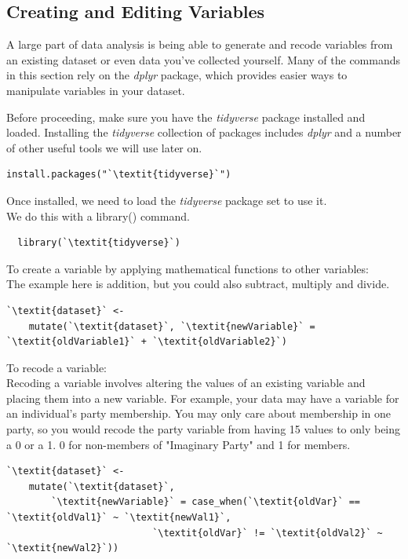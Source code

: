 \documentclass[12pt,letterpaper]{article}
\newcommand{\ind}{\phantom{AA}}
\begin{document}
\subsection{Creating and Editing Variables}
\normalsize 
A large part of data analysis is being able to generate and recode variables from an existing dataset or even data you've collected yourself. Many of the commands in this section rely on the \textit{dplyr} package, which provides easier ways to manipulate variables in your dataset. 

\vspace{1em}

\begin{tcolorbox}[title = Recoding Variables]
Before proceeding, make sure you have the \textit{tidyverse} package installed and loaded. Installing the \textit{tidyverse} collection of packages includes \textit{dplyr} and a number of other useful tools we will use later on. 
\begin{lstlisting}[frameround = t t t t, backgroundcolor = \color{lightgray}]
  install.packages("`\textit{tidyverse}`")
\end{lstlisting}
Once installed, we need to load the \textit{tidyverse} package set to use it. \\ \ind We do this with a library() command.
\begin{lstlisting}
  library(`\textit{tidyverse}`)
\end{lstlisting}
To create a variable by applying mathematical functions to other variables:\\
\ind The example here is addition, but you could also subtract, multiply and divide. 
\begin{lstlisting}
`\textit{dataset}` <-
    mutate(`\textit{dataset}`, `\textit{newVariable}` = `\textit{oldVariable1}` + `\textit{oldVariable2}`)
\end{lstlisting}
To recode a variable:\\
\ind Recoding a variable involves altering the values of an existing variable and placing them into a new variable. For example, your data may have a variable for an individual's party membership. You may only care about membership in one party, so you would recode the party variable from having 15 values to only being a 0 or a 1. 0 for non-members of "Imaginary Party" and 1 for members.
\begin{lstlisting}
`\textit{dataset}` <-
    mutate(`\textit{dataset}`, 
        `\textit{newVariable}` = case_when(`\textit{oldVar}` == `\textit{oldVal1}` ~ `\textit{newVal1}`,
  	                      `\textit{oldVar}` != `\textit{oldVal2}` ~ `\textit{newVal2}`))
\end{lstlisting}
\end{tcolorbox}
\end{document}
